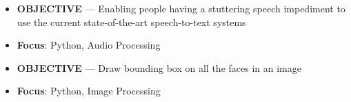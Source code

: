 \documentclass[10pt,a4paper]{altacv}
\begin{document}

%

\begin{itemize}
	\item \textbf{OBJECTIVE} --- Enabling people having a stuttering speech impediment to use the current state-of-the-art speech-to-text systems
	\item \textbf{Focus}: Python, Audio Processing
\end{itemize}


\begin{itemize}
	\item \textbf{OBJECTIVE} --- Draw bounding box on all the faces in an image
	\item \textbf{Focus}: Python, Image Processing
\end{itemize}
\end{document}

